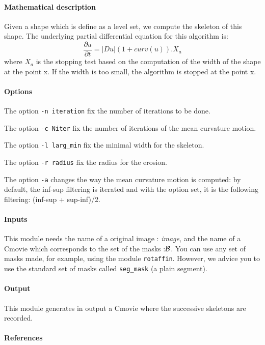 
\paragraph{Mathematical description} \mbox{}

Given a shape which is define as a level set,
we compute the skeleton of this shape.
The underlying partial differential equation for this
algorithm is:
$$ \frac{\partial u}{\partial t} = |Du| (1+curv(u)).X_a$$
where $X_a$ is the stopping test based on the computation
of the width of the shape at the point x. If the width is too small,
the algorithm is stopped at the point x.

\paragraph{Options } \mbox{}

The option \verb+-n iteration+ fix the number of iterations to be done. 

The option \verb+-c Niter+ fix the number of iterations of the 
mean curvature motion. 

The option \verb+-l larg_min+ fix the minimal width for the skeleton.

The option \verb+-r radius+ fix the radius for the erosion.

The option \verb+-a+ changes the way the mean curvature motion is
computed: by default, the inf-sup filtering is iterated and 
with the option set, it is the following filtering:
(inf-sup + sup-inf)/2.

\paragraph{Inputs} \mbox{}

This module needs the name of a original image : {\it image}, and the
name of a Cmovie which corresponds to the set of the masks :$\cal B$. 
You can use any set of masks made, for example, using the module 
\verb+rotaffin+.
However, we advice you to use the standard set of masks called 
\verb+seg_mask+ (a plain segment).

\paragraph{Output} \mbox{}

This module generates in output a Cmovie where the successive skeletons 
are recorded.


\paragraph{References} \mbox{}

